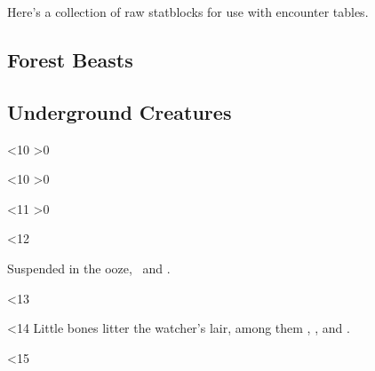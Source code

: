 \documentclass[10pt,twoside]{book}
\begin{document}
\frontmatter


\noindent
Here's a collection of raw \glspl{statblock} for use with encounter tables.

\clearpage
\pagestyle{minizine}

\subsection{Forest Beasts}

\auroch

\basilisk

\basilisk

\basilisk

\bear

\boar

\ifodd\month
  \cat
\fi

\griffin

\griffin

\griffin

\horse

\mouthdigger

\mouthdigger

\chitincrawler

\chitincrawler

\crawlerSwarm

\crawlerSwarm

\stirgeSwarm

\wolf

\woodspy

\woodspy

\clearpage

\subsection{Underground Creatures}

\ifnum\thepage<10
  \sporeFolk
  \ifnum\value{Charisma}>0
    {\small{}}
  \fi%
\fi

\ifnum\thepage<10
  \sporeFolk
  \ifnum\value{Charisma}>0
    {\small{}}
  \fi%
\fi

\null

\ifnum\thepage<11
  \sporeFolk
  \ifnum\value{Charisma}>0
    {\small{}}
  \fi%
\fi

\umberhulk

\umberhulk

\clearpage

\jelly

\null

\ifnum\thepage<12
  \jelly
  \jelly

  Suspended in the ooze, \lootJewellery\ and \lootMedium.
\fi

\null

\ifnum\thepage<13
  \jelly
  \jelly
  \olmSwarm
  \clearpage
\fi

\null

\ifnum\thepage<14
  \watcher
  Little bones litter the watcher's lair, among them \lootGoblin, \lootGoblin, and \lootGoblin.
\fi

\ifnum\thepage<15
  \watcher
\fi

\null
\end{document}
